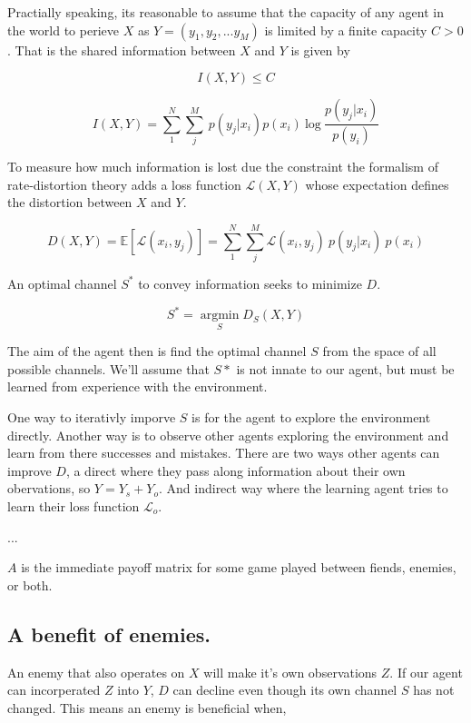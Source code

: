 \documentclass[8pt]{article}
\begin{document}
Practially speaking, its  reasonable to assume that the capacity of any agent in the world to perieve $X$ as $Y = (y_1, y_2, ... y_M)$ is limited by a finite capacity $C > 0$. That is the shared information between $X$ and $Y$ is given by

\begin{equation}
    I(X,Y) \leq C
\end{equation}

\begin{equation}
    I(X,Y) = \sum^{N}_{1} \sum^{M}_{j} \ p(y_j|x_i) p(x_i) \ \text{log} \ \frac{p(y_j|x_i)}{p(y_i)}
\end{equation}

To measure how much information is lost due the constraint the formalism of rate-distortion theory adds a loss function $\mathcal{L}(X,Y)$ whose expectation defines the distortion between $X$ and $Y$.

\begin{equation}
    D(X,Y) = \mathbb E [\mathcal{L}(x_i,y_j)] = \sum^{N}_{1} \sum^{M}_{j} \mathcal{L}(x_i,y_j) \ p(y_j|x_i) \ p(x_i)
\end{equation}

An optimal channel $S^{*}$ to convey information seeks to minimize $D$.

\begin{equation}
    S^{*} = \operatorname*{argmin}_S D_S(X,Y)
\end{equation}

The aim of the agent then is find the optimal channel $S$ from the space of all possible channels. We'll assume that $S*$ is not innate to our agent, but must be learned from experience with the environment. 

One way to iterativly imporve $S$ is for the agent to explore the environment directly. Another way is to observe other agents exploring the environment and learn from there successes and mistakes. There are two ways other agents can improve $D$, a direct where they pass along information about their own obervations, so $Y = Y_s + Y_o$. And indirect way where the learning agent tries to learn their loss function $\mathcal{L}_o$.

...

$A$ is the immediate payoff matrix for some game played between fiends, enemies, or both.


\subsection*{A benefit of enemies.}
An enemy that also operates on $X$ will make it's own observations $Z$. If our agent can incorperated $Z$ into $Y$, $D$ can decline even though its own channel $S$ has not changed. This means an enemy is beneficial when,
\end{document}
